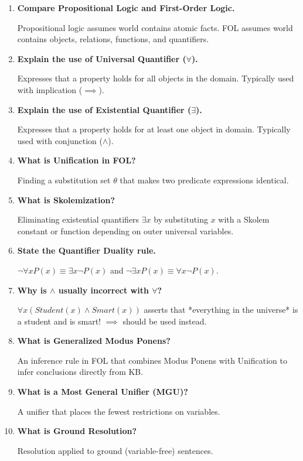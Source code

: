 \documentclass[12pt,a4paper]{article}
\newcommand{\Q}[1]{\textbf{#1}\par\noindent\ignorespaces}
\begin{document}
\begin{tcolorbox}[exambox, title={\textbf{Frequently Asked / Viva Questions}}]
  \begin{enumerate}[topsep=0pt, label=\textbf{Q\arabic*.}, itemsep=5pt]
    \item \Q{Compare Propositional Logic and First-Order Logic.}
    Propositional logic assumes world contains atomic facts. FOL assumes world contains objects, relations, functions, and quantifiers.

    \item \Q{Explain the use of Universal Quantifier ($\forall$).}
    Expresses that a property holds for all objects in the domain. Typically used with implication ($\implies$).

    \item \Q{Explain the use of Existential Quantifier ($\exists$).}
    Expresses that a property holds for at least one object in domain. Typically used with conjunction ($\land$).

    \item \Q{What is Unification in FOL?}
    Finding a substitution set $\theta$ that makes two predicate expressions identical.

    \item \Q{What is Skolemization?}
    Eliminating existential quantifiers $\exists x$ by substituting $x$ with a Skolem constant or function depending on outer universal variables.

    \item \Q{State the Quantifier Duality rule.}
    $\neg \forall x P(x) \equiv \exists x \neg P(x)$ and $\neg \exists x P(x) \equiv \forall x \neg P(x)$.

    \item \Q{Why is $\land$ usually incorrect with $\forall$?}
    $\forall x (Student(x) \land Smart(x))$ asserts that *everything in the universe* is a student and is smart! $\implies$ should be used instead.

    \item \Q{What is Generalized Modus Ponens?}
    An inference rule in FOL that combines Modus Ponens with Unification to infer conclusions directly from KB.

    \item \Q{What is a Most General Unifier (MGU)?}
    A unifier that places the fewest restrictions on variables.

    \item \Q{What is Ground Resolution?}
    Resolution applied to ground (variable-free) sentences.
  \end{enumerate}
\end{tcolorbox}
\end{document}
